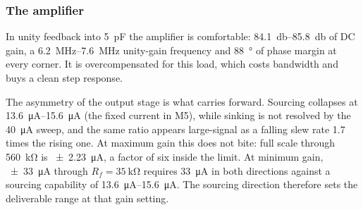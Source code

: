 
\subsubsection{The amplifier}

In unity feedback into \SI{5}{\pico\farad} the amplifier is comfortable:
\SIrange{84.1}{85.8}{\decibel} of DC gain, a \SIrange{6.2}{7.6}{\mega\hertz} unity-gain
frequency and \SI{88}{\degree} of phase margin at every corner. It is overcompensated
for this load, which costs bandwidth and buys a clean step response.

The asymmetry of the output stage is what carries forward. Sourcing collapses at
\SIrange{13.6}{15.6}{\micro\ampere} (the fixed current in M5), while sinking is not
resolved by the \SI{40}{\micro\ampere} sweep, and the same ratio appears large-signal as
a falling slew rate \num{1.7} times the rising one. At maximum gain this does not bite:
full scale through \SI{560}{\kilo\ohm} is \SI{\pm 2.23}{\micro\ampere}, a factor of six
inside the limit. At minimum gain, \SI{\pm 33}{\micro\ampere}
through $R_f = \SI{35}{\kilo\ohm}$ requires \SI{33}{\micro\ampere} in both directions
against a sourcing capability of \SIrange{13.6}{15.6}{\micro\ampere}. The sourcing
direction therefore sets the deliverable range at that gain setting.
